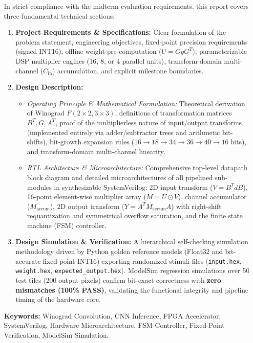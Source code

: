 \documentclass[12pt,a4paper]{article}
\begin{document}
In strict compliance with the midterm evaluation requirements, this report covers three fundamental technical sections:
\begin{enumerate}
    \item \textbf{Project Requirements \& Specifications:} Clear formulation of the problem statement, engineering objectives, fixed-point precision requirements (signed INT16), offline weight pre-computation ($U = G g G^T$), parameterizable DSP multiplier engines (16, 8, or 4 parallel units), transform-domain multi-channel ($C_{\text{in}}$) accumulation, and explicit milestone boundaries.
    \item \textbf{Design Description:}
    \begin{itemize}
        \item \textit{Operating Principle \& Mathematical Formulation:} Theoretical derivation of Winograd $F(2 \times 2, 3 \times 3)$, definitions of transformation matrices $B^T, G, A^T$, proof of the multiplierless nature of input/output transforms (implemented entirely via adder/subtractor trees and arithmetic bit-shifts), bit-growth expansion rules ($16 \to 18 \to 34 \to 36 \to 40 \to 16$ bits), and transform-domain multi-channel linearity.
        \item \textit{RTL Architecture \& Microarchitecture:} Comprehensive top-level datapath block diagram and detailed microarchitectures of all pipelined sub-modules in synthesizable SystemVerilog: 2D input transform ($V = B^T d B$), 16-point element-wise multiplier array ($M = U \odot V$), channel accumulator ($M_{\text{accum}}$), 2D output transform ($Y = A^T M_{\text{accum}} A$) with right-shift requantization and symmetrical overflow saturation, and the finite state machine (FSM) controller.
    \end{itemize}
    \item \textbf{Design Simulation \& Verification:} A hierarchical self-checking simulation methodology driven by Python golden reference models (Float32 and bit-accurate fixed-point INT16) exporting randomized stimuli files (\texttt{input.hex}, \texttt{weight.hex}, \texttt{expected\_output.hex}). ModelSim regression simulations over 50 test tiles (200 output pixels) confirm bit-exact correctness with \textbf{zero mismatches (100\% PASS)}, validating the functional integrity and pipeline timing of the hardware core.
\end{enumerate}

\vspace{0.8cm}
\noindent\textbf{Keywords:} Winograd Convolution, CNN Inference, FPGA Accelerator, SystemVerilog, Hardware Microarchitecture, FSM Controller, Fixed-Point Verification, ModelSim Simulation.
\end{document}
